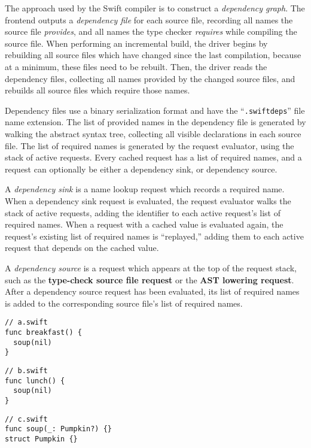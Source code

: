 \documentclass[a4paper,headsepline,bibliography=totoc,toc=flat,fleqn,twoside=semi]{scrbook}
\theoremstyle{definition}
\theoremstyle{definition}
\theoremstyle{definition}
\begin{document}
The approach used by the Swift compiler is to construct a \emph{dependency graph}. The frontend outputs a \emph{dependency file} for each source file, recording all names the source file \emph{provides}, and all names the type checker \emph{requires} while compiling the source file. When performing an incremental build, the driver begins by rebuilding all source files which have changed since the last compilation, because at a minimum, these files need to be rebuilt. Then, the driver reads the dependency files, collecting all names provided by the changed source files, and rebuilds all source files which require those names.

Dependency files use a binary serialization format and have the ``\texttt{.swiftdeps}'' file name extension. The list of provided names in the dependency file is generated by walking the abstract syntax tree, collecting all visible declarations in each source file. The list of required names is generated by the request evaluator, using the stack of active requests. Every cached request has a list of required names, and a request can optionally be either a dependency sink, or dependency source.

A \emph{dependency sink} is a name lookup request which records a required name. When a dependency sink request is evaluated, the request evaluator walks the stack of active requests, adding the identifier to each active request's list of required names. When a request with a cached value is evaluated again, the request's existing list of required names is ``replayed,'' adding them to each active request that depends on the cached value.

A \emph{dependency source} is a request which appears at the top of the request stack, such as the \textbf{type-check source file request} or the \textbf{AST lowering request}. After a dependency source request has been evaluated, its list of required names is added to the corresponding source file's list of required names.

\begin{listing}\label{dependencyexample}
\begin{Verbatim}
// a.swift
func breakfast() {
  soup(nil)
}
\end{Verbatim}
\begin{Verbatim}
// b.swift
func lunch() {
  soup(nil)
}
\end{Verbatim}
\begin{Verbatim}
// c.swift
func soup(_: Pumpkin?) {}
struct Pumpkin {}
\end{Verbatim}
\end{listing}
\end{document}
